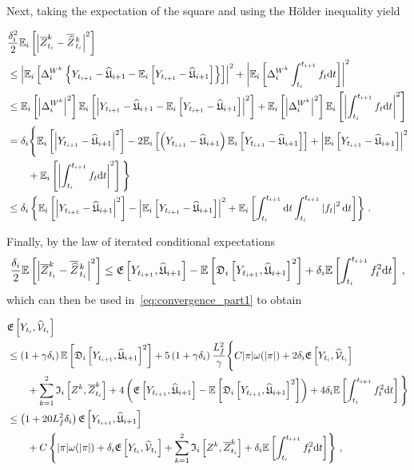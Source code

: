 Next, taking the expectation of the square and using the H{\"o}lder inequality yield
\begin{small}
\begin{align*}
    & \frac{\delta_{i}^2}{2}
    \mathbb{E}_i\left[\left|\overline{Z}^k_{t_i} - \overline{\widehat{Z}}\kern0.1em^{k}_{t_{i}}\right|^2\right] \\
    &\leq \left|\mathbb{E}_i\left[\Delta^{W^k}_{i}\left\{Y_{t_{i+1}}-\widehat{\mathfrak{U}}_{i+1}-\mathbb{E}_i\left[Y_{t_{i+1}} - \widehat{\mathfrak{U}}_{i+1}\right]\right\}\right]\right|^2 + \left|\mathbb{E}_i\left[\Delta^{W^k}_{i} \int_{t_i}^{t_{i+1}} f_{t}\mathrm{d} t\right]\right|^2 \\
    &\leq \mathbb{E}_i\left[\left|\Delta^{W^k}_{i}\right|^2\right] \mathbb{E}_i\left[\left| Y_{t_{i+1}}-\widehat{\mathfrak{U}}_{i+1} - \mathbb{E}_i\left[Y_{t_{i+1}} - \widehat{\mathfrak{U}}_{i+1}\right]\right|^2\right] + \mathbb{E}_i\left[ \left|\Delta^{W^k}_{i}\right|^2\right]\mathbb{E}_i\left[ \left|\int_{t_i}^{t_{i+1}} f_{t}\mathrm{d} t\right|^2\right] \\
    &= \delta_{i} \Bigg\{\mathbb{E}_i\left[\left| Y_{t_{i+1}}-\widehat{\mathfrak{U}}_{i+1}\right|^2\right] -2\mathbb{E}_i\left[\left(Y_{t_{i+1}}-\widehat{\mathfrak{U}}_{i+1}\right)\mathbb{E}_i\left[Y_{t_{i+1}}-\widehat{\mathfrak{U}}_{i+1}\right]\right] + \left|\mathbb{E}_i\left[ Y_{t_{i+1}}-\widehat{\mathfrak{U}}_{i+1}\right]\right|^2 \\
    & \qquad + \mathbb{E}_i\left[ \left|\int_{t_i}^{t_{i+1}} f_{t}\mathrm{d} t\right|^2\right]\Bigg\} \\
    &\leq \delta_{i} \left\{\mathbb{E}_i\left[\left| Y_{t_{i+1}}-\widehat{\mathfrak{U}}_{i+1}\right|^2\right] - \left|\mathbb{E}_i\left[ Y_{t_{i+1}}-\widehat{\mathfrak{U}}_{i+1}\right]\right|^2 + \mathbb{E}_i\left[\int_{t_i}^{t_{i+1}}\mathrm{d} t  \int_{t_i}^{t_{i+1}} \left| f_{t}\right|^2\mathrm{d} t\right]\right\}\,.
\end{align*}
\end{small}%
Finally, by the law of iterated conditional expectations
\begin{equation}\label{eq:convergence_part1_2}
\frac{\delta_{i}}{2}
\mathbb{E}\left[\left|\overline{Z}^k_{t_i} - \overline{\widehat{Z}}\kern0.1em^{k}_{t_{i}}\right|^2\right]
\leq \mathfrak{E}\left[Y_{t_{i+1}}, \widehat{\mathfrak{U}}_{i+1}\right]
- \mathbb{E}\left[\mathfrak{D}_i\left[Y_{t_{i+1}}, \widehat{\mathfrak{U}}_{i+1}\right]^{2}\right]
 + \delta_{i}  \mathbb{E}\left[\int_{t_i}^{t_{i+1}}
f_{t}^2 \mathrm{d} t\right]\,,
\end{equation}
which can then be used in~\eqref{eq:convergence_part1} to obtain
\begin{small}
\begin{align}
\begin{split}
& \mathfrak{E}\left[Y_{t_i}, \widehat{\mathcal{V}}_{t_i}\right] \\
& \leq\left(1+\gamma \delta_{i} \right) \mathbb{E}\left[\mathfrak{D}_i\left[Y_{t_{i+1}}, \widehat{\mathfrak{U}}_{i+1}\right]^2\right] 
 + 5\left(1+\gamma \delta_{i} \right) \frac{L_f^2}{\gamma}\Bigg\{C |\pi| \omega(|\pi|) + 2\delta_{i}  \mathfrak{E}\left[Y_{t_i}, \widehat{\mathcal{V}}_{t_i}\right] \\
&\qquad +\sum_{k=1}^2\mathfrak{I}_i\left[Z^k, \overline{Z}^{k}_{t_i}\right] + 4\left(\mathfrak{E}\left[Y_{t_{i+1}}, \widehat{\mathfrak{U}}_{i+1}\right] - \mathbb{E}\left[\mathfrak{D}_i\left[Y_{t_{i+1}}, \widehat{\mathfrak{U}}_{i+1}\right]^{2}\right]\right)
 + 4 \delta_{i}  \mathbb{E}\left[\int_{t_i}^{t_{i+1}}f_{t}^2 \mathrm{d} t\right]\Bigg\} \\
& \leq \left(1+20 L_f^2 \delta_{i} \right) \mathfrak{E}\left[Y_{t_{i+1}}, \widehat{\mathfrak{U}}_{i+1}\right] \\
& \qquad + C \left\{|\pi| \omega(|\pi|) + \delta_{i} \mathfrak{E}\left[Y_{t_i}, \widehat{\mathcal{V}}_{t_i}\right] + \sum_{k=1}^{2}\mathfrak{I}_i\left[Z^k, \overline{Z}^{k}_{t_i}\right]  + \delta_{i}  \mathbb{E}\left[\int_{t_i}^{t_{i+1}}f_{t}^2 \mathrm{d} t\right]\right\}\,,
\end{split}
\end{align}
\end{small}%
